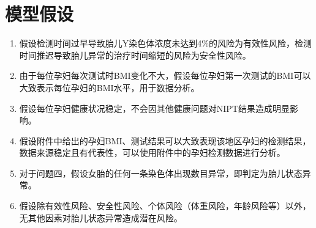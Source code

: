 \documentclass[withoutpreface,bwprint]{cumcmthesis}
\begin{document}

\section{模型假设}

\begin{enumerate}

\item 假设检测时间过早导致胎儿Y染色体浓度未达到4\%的风险为有效性风险，检测时间推迟导致胎儿异常的治疗时间缩短的风险为安全性风险。

\item 由于每位孕妇每次测试时BMI变化不大，假设每位孕妇第一次测试的BMI可以大致表示每位孕妇的BMI水平，用于数据分析。

\item 假设每位孕妇健康状况稳定，不会因其他健康问题对NIPT结果造成明显影响。

\item 假设附件中给出的孕妇BMI、测试结果可以大致表现该地区孕妇的检测结果，数据来源稳定且有代表性，可以使用附件中的孕妇检测数据进行分析。

\item 对于问题四，假设女胎的任何一条染色体出现数目异常，即判定为胎儿状态异常。

\item 假设除有效性风险、安全性风险、个体风险（体重风险，年龄风险等）以外，无其他因素对胎儿状态异常造成潜在风险。

\end{enumerate}

\end{document}
